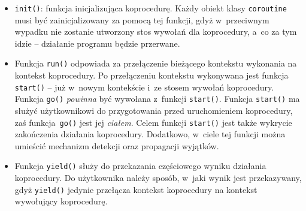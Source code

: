 \documentclass[12pt]{mwart}
\newcommand{\code}{\texttt}
\newcommand{\procbr}{()}
\newcommand{\function}[1]{\code{#1\procbr}}
\begin{document}
  \begin{itemize}
    \item \function{init}: funkcja inicjalizująca koprocedurę. Każdy obiekt klasy \code{coroutine} musi być zainicjalizowany za pomocą tej funkcji,
      gdyż w~przeciwnym wypadku nie zostanie utworzony stos wywołań dla koprocedury, a~co za tym idzie -- działanie programu będzie przerwane.
    \item Funkcja \function{run} odpowiada za przełączenie bieżącego kontekstu wykonania na kontekst koprocedury. 
      Po przełączeniu kontekstu wykonywana jest funkcja \function{start} -- już w~nowym kontekście i~ze stosem wywołań koprocedury. Funkcja \function{go}
      \emph{powinna} być wywołana z~funkcji \function{start}. Funkcja \function{start} ma służyć użytkownikowi do przygotowania przed uruchomieniem koprocedury,
      zaś funkcja~\function{go} jest jej \emph{ciałem}. Celem funkcji \function{start} jest także wykrycie zakończenia działania koprocedury.
      Dodatkowo, w~ciele tej funkcji można umieścić mechanizm detekcji oraz propagacji wyjątków.
    \item Funkcja \function{yield} służy do przekazania częściowego wyniku działania koprocedury. Do użytkownika należy sposób, w~jaki wynik jest przekazywany,
      gdyż \function{yield} jedynie przełącza kontekst koprocedury na kontekst wywołujący koprocedurę.
  \end{itemize}
\par
%
\end{document}
